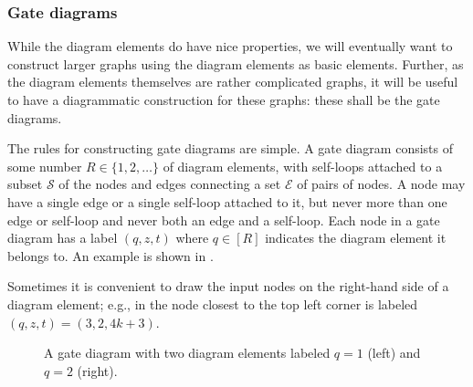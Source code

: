 \documentclass[../thesis-main/thesis-main]{subfiles}
\begin{document}
\subsubsection{Gate diagrams}\label{sec:gate_diagrams}

While the diagram elements do have nice properties, we will eventually want to construct larger graphs using the diagram elements as basic elements.  Further, as the diagram elements themselves are rather complicated graphs, it will be useful to have a diagrammatic construction for these graphs:  these shall be the gate diagrams.

The rules for constructing gate diagrams are simple. A gate diagram consists of some number $R \in \{1,2,\ldots\}$ of diagram elements, with self-loops attached to a subset $\mathcal{S}$ of the nodes and edges connecting a set $\mathcal{E}$ of pairs of nodes. A node may have a single edge or a single self-loop attached to it, but never more than one edge or self-loop and never both an edge and a self-loop. Each node in a gate diagram has a label $(q,z,t)$ where $q \in [R]$ indicates the diagram element it belongs to. An example is shown in .

Sometimes it is convenient to draw the input nodes on the right-hand side of a diagram element; e.g., in  the node closest to the top left corner is labeled $(q,z,t)=(3,2,4k+3)$.

\begin{figure}
\centering 
{}

\caption{A gate diagram with two diagram elements labeled $q=1$ (left) and $q=2$ (right).
\label{fig:simple_gate_diagram}}
\end{figure}
\end{document}
